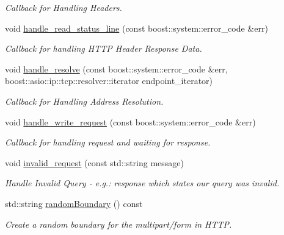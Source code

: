 \begin{DoxyCompactItemize}
\begin{DoxyCompactList}\small\item\em Callback for Handling Headers. \end{DoxyCompactList}\item 
void \hyperlink{classrapp_1_1services_1_1asio__service__http_ad226cd37d18a2a67aad14e4d33f36ad1}{handle\-\_\-read\-\_\-status\-\_\-line} (const boost\-::system\-::error\-\_\-code \&err)
\begin{DoxyCompactList}\small\item\em Callback for handling H\-T\-T\-P Header Response Data. \end{DoxyCompactList}\item 
void \hyperlink{classrapp_1_1services_1_1asio__service__http_a046d89a8bca90438e131aae591cdc593}{handle\-\_\-resolve} (const boost\-::system\-::error\-\_\-code \&err, boost\-::asio\-::ip\-::tcp\-::resolver\-::iterator endpoint\-\_\-iterator)
\begin{DoxyCompactList}\small\item\em Callback for Handling Address Resolution. \end{DoxyCompactList}\item 
void \hyperlink{classrapp_1_1services_1_1asio__service__http_a2f1e6bf1f287798b48c671ce9596948a}{handle\-\_\-write\-\_\-request} (const boost\-::system\-::error\-\_\-code \&err)
\begin{DoxyCompactList}\small\item\em Callback for handling request and waiting for response. \end{DoxyCompactList}\item 
void \hyperlink{classrapp_1_1services_1_1asio__service__http_abcf7c541c4bf587da464ef24fa446743}{invalid\-\_\-request} (const std\-::string message)
\begin{DoxyCompactList}\small\item\em Handle Invalid Query -\/ e.\-g.\-: response which states our query was invalid. \end{DoxyCompactList}\item 
std\-::string \hyperlink{classrapp_1_1services_1_1asio__service__http_a11439cf4cd0a2a943bce9e91018fe8e0}{random\-Boundary} () const 
\begin{DoxyCompactList}\small\item\em Create a random boundary for the multipart/form in H\-T\-T\-P. \end{DoxyCompactList}\end{DoxyCompactItemize}
